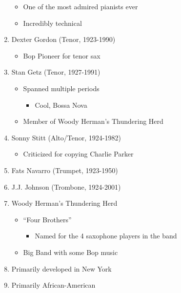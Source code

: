 \documentclass[]{article}
\providecommand{\tightlist}{%
  \setlength{\itemsep}{0pt}\setlength{\parskip}{0pt}}
\begin{document}
\begin{enumerate}
  \begin{itemize}
  \tightlist
  \item
    One of the most admired pianists ever
  \item
    Incredibly technical
  \end{itemize}
\item
  Dexter Gordon (Tenor, 1923-1990)

  \begin{itemize}
  \tightlist
  \item
    Bop Pioneer for tenor sax
  \end{itemize}
\item
  Stan Getz (Tenor, 1927-1991)

  \begin{itemize}
  \tightlist
  \item
    Spanned multiple periods

    \begin{itemize}
    \tightlist
    \item
      Cool, Bossa Nova
    \end{itemize}
  \item
    Member of Woody Herman's Thundering Herd
  \end{itemize}
\item
  Sonny Stitt (Alto/Tenor, 1924-1982)

  \begin{itemize}
  \tightlist
  \item
    Criticized for copying Charlie Parker
  \end{itemize}
\item
  Fats Navarro (Trumpet, 1923-1950)
\item
  J.J. Johnson (Trombone, 1924-2001)
\item
  Woody Herman's Thundering Herd

  \begin{itemize}
  \tightlist
  \item
    ``Four Brothers''

    \begin{itemize}
    \tightlist
    \item
      Named for the 4 saxophone players in the band
    \end{itemize}
  \item
    Big Band with some Bop music
  \end{itemize}
\item
  Primarily developed in New York
\item
  Primarily African-American
\end{enumerate}
\end{document}
